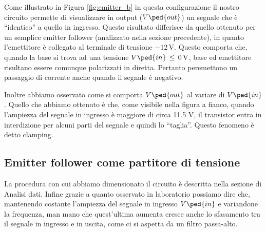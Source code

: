 Come illustrato in Figura \ref{fig:emitter_b} in questa configurazione il nostro circuito permette di visualizzare in output ($V\ped{out}$) un segnale che è ``identico'' a quello in ingresso. Questo risultato differisce da quello ottenuto per un semplice emitter follower (analizzato nella sezione precedente), in quanto l'emettitore è collegato al terminale di tensione $-12\,\si{\volt}$. Questo comporta che, quando la base si trova ad una tensione $V\ped{in}\,\leq\,0\,\si{\volt}$, base ed emettitore risultano essere comunque polarizzati in diretta. Pertanto peremettono un passaggio di corrente anche quando il segnale è negativo.

Inoltre abbiamo osservato come si comporta $V\ped{out}$ al variare di $V\ped{in}$. Quello che abbiamo ottenuto è che, come visibile nella figura a fianco, quando l'ampiezza del segnale in ingresso è maggiore di circa 11.5 V, il transistor entra in interdizione per alcuni parti del segnale e quindi lo ``taglia''. Questo fenomeno è detto clamping.

\subsection*{Emitter follower come partitore di tensione}

La procedura con cui abbiamo dimensionato il circuito è descritta nella sezione di Analisi dati. Infine grazie a quanto osservato in laboratorio possiamo dire che, mantenendo costante l'ampiezza del segnale in ingresso $V\ped{in}$ e variandone la frequenza, man mano che quest'ultima aumenta cresce anche lo sfasamento tra il segnale in ingresso e in uscita, come ci si aspetta da un filtro passa-alto.
